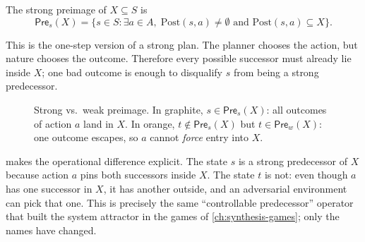 \begin{definition}
\label{def:strong-preimage}
The strong preimage of $X\subseteq S$ is
\[
  \mathsf{Pre}_s(X)=
  \{s\in S:\exists a\in A,\;
        \mathrm{Post}(s,a)\neq\emptyset
        \text{ and }
        \mathrm{Post}(s,a)\subseteq X\}.
\]
\end{definition}

This is the one-step version of a strong plan.  The planner chooses the
action, but nature chooses the outcome.  Therefore every possible
successor must already lie inside $X$; one bad outcome is enough to
disqualify $s$ from being a strong predecessor.

\begin{figure}[ht]
\centering
{}
\caption{Strong vs.\ weak preimage.  In graphite, $s\in\mathsf{Pre}_s(X)$:
all outcomes of action $a$ land in $X$.  In orange, $t\notin\mathsf{Pre}_s(X)$
but $t\in\mathsf{Pre}_w(X)$: one outcome escapes, so $a$ cannot \emph{force}
entry into $X$.}
\label{fig:strong-preimage}
\end{figure}

 makes the operational difference explicit.
The state $s$ is a strong predecessor of $X$ because action $a$ pins
both successors inside $X$.  The state $t$ is not: even though $a$ has
one successor in $X$, it has another outside, and an adversarial
environment can pick that one.  This is precisely the same
``controllable predecessor'' operator that built the system attractor
in the games of \cref{ch:synthesis-games}; only the names have changed.


